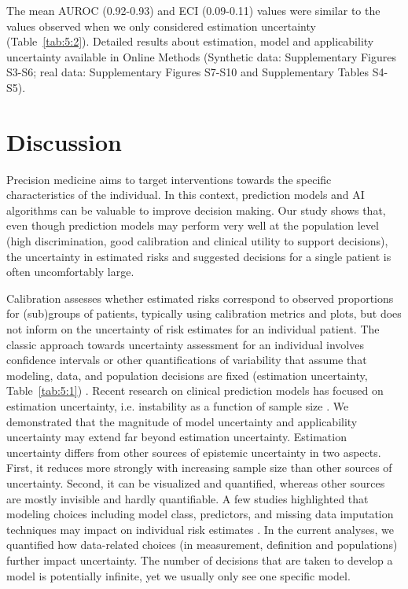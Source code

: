 The mean \gls{AUROC} (0.92-0.93) and \gls{ECI} (0.09-0.11) values were similar to the values observed when we only considered estimation uncertainty (Table~\ref{tab:5:2}). Detailed results about estimation, model and applicability uncertainty available in Online Methods (Synthetic data: Supplementary Figures S3-S6; real data: Supplementary Figures S7-S10 and Supplementary Tables S4-S5).

\section{Discussion}

Precision medicine aims to target interventions towards the specific characteristics of the individual. In this context, prediction models and \gls{AI} algorithms can be valuable to improve decision making. Our study shows that, even though prediction models may perform very well at the population level (high discrimination, good calibration and clinical utility to support decisions), the uncertainty in estimated risks and suggested decisions for a single patient is often uncomfortably large.

Calibration assesses whether estimated risks correspond to observed proportions for (sub)groups of patients, typically using calibration metrics and plots, but does not inform on the uncertainty of risk estimates for an individual patient. The classic approach towards uncertainty assessment for an individual involves confidence intervals or other quantifications of variability that assume that modeling, data, and population decisions are fixed (estimation uncertainty, Table~\ref{tab:5:1}) \cite{rileyStabilityClinicalPrediction2023,thomassenEffectiveSampleSize2024,kompaSecondOpinionNeeded2021}. Recent research on clinical prediction models has focused on estimation uncertainty, i.e. instability as a function of sample size \cite{rileyStabilityClinicalPrediction2023,rileyClinicalPredictionModels2023,rileyUncertaintyRiskEstimates2025}. We demonstrated that the magnitude of model uncertainty and applicability uncertainty may extend far beyond estimation uncertainty. Estimation uncertainty differs from other sources of epistemic uncertainty in two aspects. First, it reduces more strongly with increasing sample size than other sources of uncertainty. Second, it can be visualized and quantified, whereas other sources are mostly invisible and hardly quantifiable. A few studies highlighted that modeling choices including model class, predictors, and missing data imputation techniques may impact on individual risk estimates \cite{ledgerMulticlassRiskModels2023,pateUncertaintyUsingRisk2019,liConsistencyVarietyMachine2020}. In the current analyses, we quantified how data-related choices (in measurement, definition and populations) further impact uncertainty. The number of decisions that are taken to develop a model is potentially infinite, yet we usually only see one specific model.


